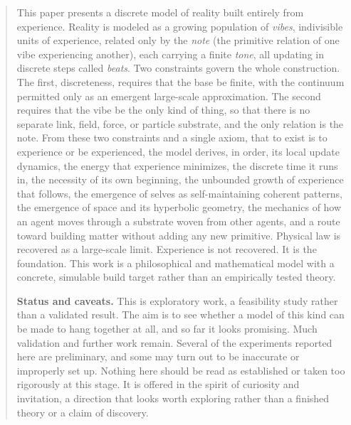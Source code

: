 \begin{abstract}
This paper presents a discrete model of reality built entirely from experience. Reality is modeled as a growing population of \emph{vibes}, indivisible units of experience, related only by the \emph{note} (the primitive relation of one vibe experiencing another), each carrying a finite \emph{tone}, all updating in discrete steps called \emph{beats}. Two constraints govern the whole construction. The first, discreteness, requires that the base be finite, with the continuum permitted only as an emergent large-scale approximation. The second requires that the vibe be the only kind of thing, so that there is no separate link, field, force, or particle substrate, and the only relation is the note. From these two constraints and a single axiom, that to exist is to experience or be experienced, the model derives, in order, its local update dynamics, the energy that experience minimizes, the discrete time it runs in, the necessity of its own beginning, the unbounded growth of experience that follows, the emergence of selves as self-maintaining coherent patterns, the emergence of space and its hyperbolic geometry, the mechanics of how an agent moves through a substrate woven from other agents, and a route toward building matter without adding any new primitive. Physical law is recovered as a large-scale limit. Experience is not recovered. It is the foundation. This work is a philosophical and mathematical model with a concrete, simulable build target rather than an empirically tested theory.
\medskip

\noindent\textbf{Status and caveats.} This is exploratory work, a feasibility study rather than a validated result. The aim is to see whether a model of this kind can be made to hang together at all, and so far it looks promising. Much validation and further work remain. Several of the experiments reported here are preliminary, and some may turn out to be inaccurate or improperly set up. Nothing here should be read as established or taken too rigorously at this stage. It is offered in the spirit of curiosity and invitation, a direction that looks worth exploring rather than a finished theory or a claim of discovery.
\end{abstract}
